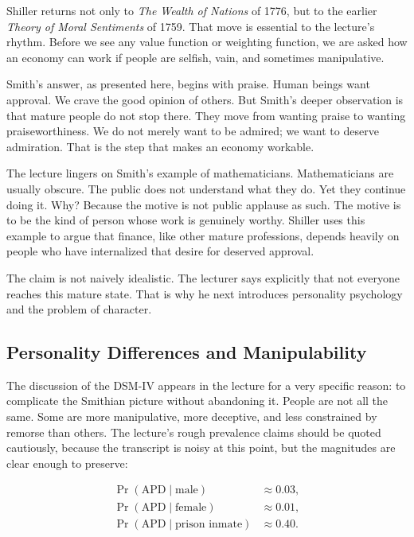 Shiller returns not only to \emph{The Wealth of Nations} of 1776, but to the earlier \emph{Theory of Moral Sentiments} of 1759. That move is essential to the lecture's rhythm. Before we see any value function or weighting function, we are asked how an economy can work if people are selfish, vain, and sometimes manipulative.

Smith's answer, as presented here, begins with praise. Human beings want approval. We crave the good opinion of others. But Smith's deeper observation is that mature people do not stop there. They move from wanting praise to wanting praiseworthiness. We do not merely want to be admired; we want to deserve admiration. That is the step that makes an economy workable.

The lecture lingers on Smith's example of mathematicians. Mathematicians are usually obscure. The public does not understand what they do. Yet they continue doing it. Why? Because the motive is not public applause as such. The motive is to be the kind of person whose work is genuinely worthy. Shiller uses this example to argue that finance, like other mature professions, depends heavily on people who have internalized that desire for deserved approval.

The claim is not naively idealistic. The lecturer says explicitly that not everyone reaches this mature state. That is why he next introduces personality psychology and the problem of character.

\subsection{Personality Differences and Manipulability}

The discussion of the DSM-IV appears in the lecture for a very specific reason: to complicate the Smithian picture without abandoning it. People are not all the same. Some are more manipulative, more deceptive, and less constrained by remorse than others. The lecture's rough prevalence claims should be quoted cautiously, because the transcript is noisy at this point, but the magnitudes are clear enough to preserve:

\begin{align}
\Pr(\text{APD}\mid \text{male}) &\approx 0.03,\\
\Pr(\text{APD}\mid \text{female}) &\approx 0.01,\\
\Pr(\text{APD}\mid \text{prison inmate}) &\approx 0.40.
\end{align}

